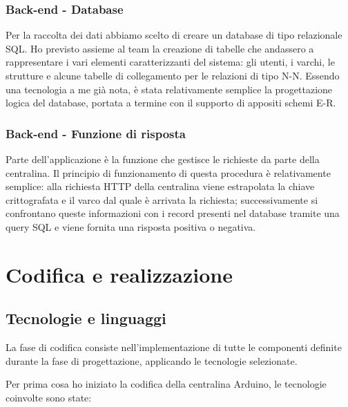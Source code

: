 \subsubsection{Back-end - Database}
Per la raccolta dei dati abbiamo scelto di creare un database di tipo relazionale SQL.
Ho previsto assieme al team la creazione di tabelle che andassero a rappresentare i vari elementi caratterizzanti del sistema: gli utenti, i varchi, le strutture e alcune tabelle di collegamento per le relazioni di tipo N-N.
Essendo una tecnologia a me già nota, è stata relativamente semplice la progettazione logica del database, portata a termine con il supporto di appositi schemi E-R.

\subsubsection{Back-end - Funzione di risposta}
Parte dell'applicazione è la funzione che gestisce le richieste da parte della centralina. Il principio di funzionamento di questa procedura è relativamente semplice: alla richiesta HTTP della centralina viene estrapolata la chiave crittografata e il varco dal quale è arrivata la richiesta; successivamente si confrontano queste informazioni con i record presenti nel database tramite una query SQL e viene fornita una risposta positiva o negativa. 

\section{Codifica e realizzazione}
\subsection{Tecnologie e linguaggi}
La fase di codifica consiste nell'implementazione di tutte le componenti definite durante la fase di progettazione, applicando le tecnologie selezionate.

Per prima cosa ho iniziato la codifica della centralina Arduino, le tecnologie coinvolte sono state:

